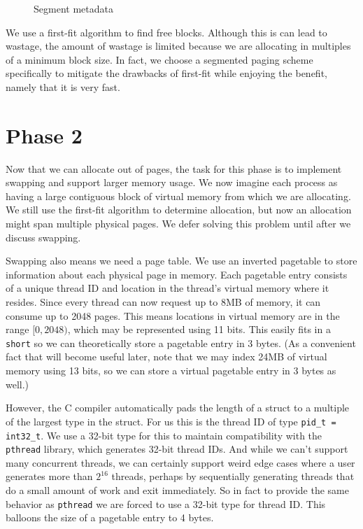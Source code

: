 \documentclass{article}
\begin{document}
\begin{figure}
\centering
{}
\caption{Segment metadata}
\label{fig:segment_metadata}
\end{figure}

We use a first-fit algorithm to find free blocks. Although this is can lead to
wastage, the amount of wastage is limited because we are allocating in multiples
of a minimum block size. In fact, we choose a segmented paging scheme
specifically to mitigate the drawbacks of first-fit while enjoying the benefit,
namely that it is very fast.

\section{Phase 2}
Now that we can allocate out of pages, the task for this phase is to implement
swapping and support larger memory usage. We now imagine each process as having
a large contiguous block of virtual memory from which we are allocating. We
still use the first-fit algorithm to determine allocation, but now an allocation
might span multiple physical pages. We defer solving this problem until after we
discuss swapping.

Swapping also means we need a page table. We use an inverted pagetable to store
information about each physical page in memory. Each pagetable entry consists of
a unique thread ID and location in the thread's virtual memory where it resides.
Since every thread can now request up to 8MB of memory, it can consume up to
2048 pages. This means locations in virtual memory are in the range $[0,2048)$,
which may be represented using 11 bits. This easily fits in a \verb|short| so we
can theoretically store a pagetable entry in 3 bytes. (As a convenient fact that
will become useful later, note that we may index 24MB of virtual memory using 13
bits, so we can store a virtual pagetable entry in 3 bytes as well.)

However, the C compiler automatically pads the length of a struct to a multiple
of the largest type in the struct. For us this is the thread ID of type
\verb|pid_t = int32_t|. We use a 32-bit type for this to maintain compatibility
with the \verb|pthread| library, which generates 32-bit thread IDs. And while we
can't support many concurrent threads, we can certainly support weird edge cases
where a user generates more than $2^16$ threads, perhaps by sequentially
generating threads that do a small amount of work and exit immediately. So in
fact to provide the same behavior as \verb|pthread| we are forced to use a
32-bit type for thread ID. This balloons the size of a pagetable entry to 4
bytes.
\end{document}
